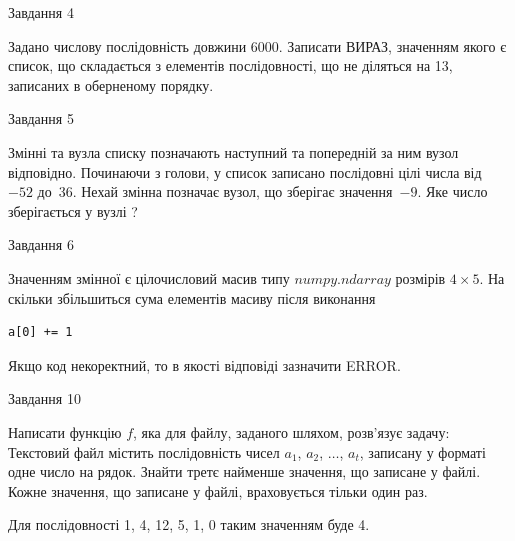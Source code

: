\documentclass[12pt, ukrainian]{article}
\begin{document}
{\begin{minipage}[t]{8.0cm}
\end{minipage}


               
{\begin{center}Завдання {4}\end{center}}
\vspace{-4mm}

 Задано числову послідовність  довжини 6000. Записати ВИРАЗ, значенням якого є список, що складається з елементів послідовності, що не діляться на 13, записаних в обернено\-му порядку.\par

\vspace{10mm}
               
{\begin{center}Завдання {5}\end{center}}
\vspace{-4mm}
Змінні  та  вузла списку позначають наступний та попередній за ним вузол відповідно. Починаючи з голови, у список записано послідовні цілі числа від~$-52$ до~$36$. Нехай змінна  позначає вузол, що зберігає значення~$-9$.
Яке число зберігається у вузлі  ?\par

               
{\begin{center}Завдання {6}\end{center}}
\vspace{-4mm}
Значенням змінної  є цілочисловий масив типу $numpy.ndarray$ розмірів $4{\times}5$. На скільки збільшиться сума елементів масиву  після виконання
\begin{verbatim}
a[0] += 1
\end{verbatim}


Якщо код некоректний, то в якості відповіді зазначити ERROR.\par

               
{\begin{center}Завдання {10}\end{center}}
\vspace{-4mm}

Написати функцію $f$, яка для файлу, заданого шляхом, розв’язує задачу:\\ Текстовий файл містить послідовність чисел $a_1$, $a_2$, $\ldots$, $a_t$, записану у форматі одне число на рядок. Знайти третє найменше значення, що записане у файлі. Кожне значення, що записане у файлі, враховується тільки один раз. \par
Для послідовності 1, 4, 12, 5, 1, 0 таким значенням буде 4.

}
\end{document}
